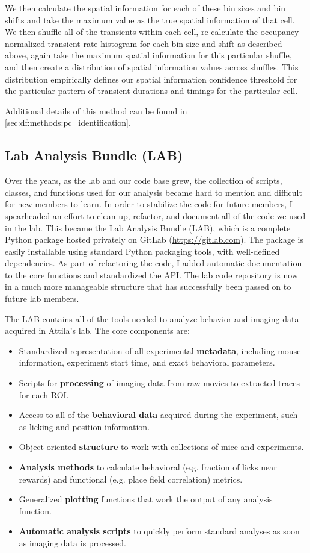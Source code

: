 We then calculate the spatial information for each of these bin sizes and bin shifts and take the maximum value as the true spatial information of that cell.
We then shuffle all of the transients within each cell, re-­calculate the occupancy normalized transient rate histogram for each bin size and shift as described above, again take the maximum spatial information for this particular shuffle, and then create a distribution of spatial information values across shuffles.
This distribution empirically defines our spatial information confidence threshold for the particular pattern of transient durations and timings for the particular cell.

Additional details of this method can be found in \autoref{sec:df:methods:pc_identification}.
 
\subsection{Lab Analysis Bundle (LAB)}
Over the years, as the lab and our code base grew, the collection of scripts, classes, and functions used for our analysis became hard to mention and difficult for new members to learn.
In order to stabilize the code for future members, I spearheaded an effort to clean-up, refactor, and document all of the code we used in the lab.
This became the Lab Analysis Bundle (LAB), which is a complete Python package hosted privately on GitLab (\url{https://gitlab.com}).
The package is easily installable using standard Python packaging tools, with well-defined dependencies.
As part of refactoring the code, I added automatic documentation to the core functions and standardized the API.
The lab code repository is now in a much more manageable structure that has successfully been passed on to future lab members.

The LAB contains all of the tools needed to analyze behavior and imaging data acquired in Attila's lab.
The core components are:
\begin{itemize}
	\item{Standardized representation of all experimental \textbf{metadata}, including mouse information, experiment start time, and exact behavioral parameters.}
	\item{Scripts for \textbf{processing} of imaging data from raw movies to extracted traces for each ROI.}
	\item{Access to all of the \textbf{behavioral data} acquired during the experiment, such as licking and position information.}
	\item{Object-oriented \textbf{structure} to work with collections of mice and experiments.}
	\item{\textbf{Analysis methods} to calculate behavioral (e.g. fraction of licks near rewards) and functional (e.g. place field correlation) metrics.}
	\item{Generalized \textbf{plotting} functions that work the output of any analysis function.}
	\item{\textbf{Automatic analysis scripts} to quickly perform standard analyses as soon as imaging data is processed.}
\end{itemize}

